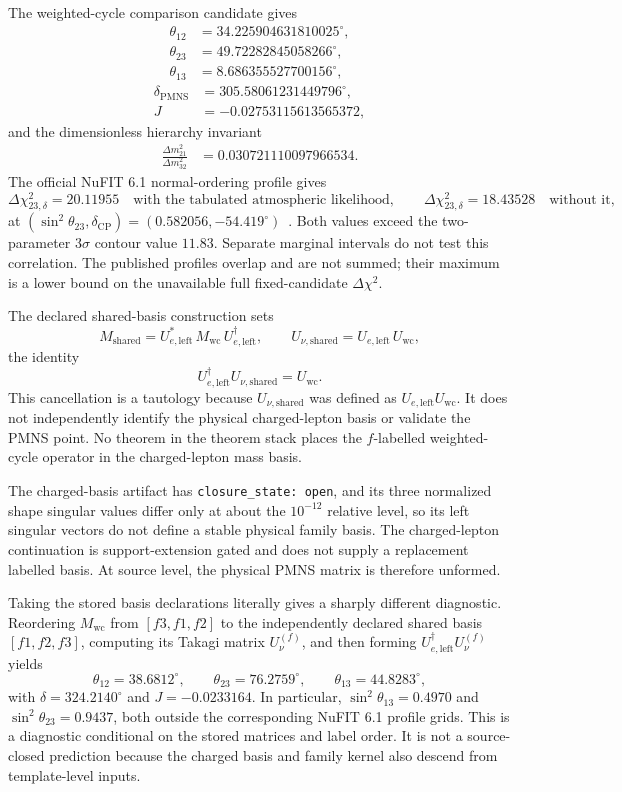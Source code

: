 \documentclass[11pt]{article}
\begin{document}
The weighted-cycle comparison candidate gives
\[
\begin{aligned}
\theta_{12}&=34.225904631810025^\circ,\\
\theta_{23}&=49.72282845058266^\circ,\\
\theta_{13}&=8.686355527700156^\circ,
\end{aligned}
\]
\[
\begin{aligned}
\delta_{\mathrm{PMNS}}&=305.58061231449796^\circ,\\
J&=-0.02753115613565372,
\end{aligned}
\]
and the dimensionless hierarchy invariant
\[
\begin{aligned}
\frac{\Delta m_{21}^2}{\Delta m_{32}^2}
&=0.030721110097966534.
\end{aligned}
\]
The official NuFIT 6.1 normal-ordering profile gives
\[
\Delta\chi^2_{23,\delta}=20.11955
\quad\text{with the tabulated atmospheric likelihood},
\qquad
\Delta\chi^2_{23,\delta}=18.43528
\quad\text{without it},
\]
at \((\sin^2\theta_{23},\delta_{\mathrm{CP}})=(0.582056,-54.419^\circ)\)~\cite{nufit61}.
Both values exceed the two-parameter \(3\sigma\) contour value \(11.83\). Separate marginal
intervals do not test this correlation. The published profiles overlap and are not summed;
their maximum is a lower bound on the unavailable full fixed-candidate \(\Delta\chi^2\).

The declared shared-basis construction sets
\[
M_{\mathrm{shared}}=U_{e,\mathrm{left}}^*\,M_{\mathrm{wc}}\,U_{e,\mathrm{left}}^\dagger,
\qquad
U_{\nu,\mathrm{shared}}=U_{e,\mathrm{left}}\,U_{\mathrm{wc}},
\]
the identity
\[
U_{e,\mathrm{left}}^\dagger U_{\nu,\mathrm{shared}}=U_{\mathrm{wc}}.
\]
This cancellation is a tautology because \(U_{\nu,\mathrm{shared}}\) was defined as
\(U_{e,\mathrm{left}}U_{\mathrm{wc}}\). It does not independently identify the physical
charged-lepton basis or validate the PMNS point. No theorem in the theorem stack places the
\(f\)-labelled weighted-cycle operator in the charged-lepton mass basis.

The charged-basis artifact has
\texttt{closure\_state: open}, and its three normalized shape singular values differ only at about
the \(10^{-12}\) relative level, so its left singular vectors do not define a stable physical
family basis. The charged-lepton continuation is support-extension gated and does not
supply a replacement labelled basis. At source level, the physical PMNS matrix is therefore
unformed.

Taking the stored basis declarations literally gives a sharply different diagnostic. Reordering
\(M_{\mathrm{wc}}\) from \([f3,f1,f2]\) to the independently declared shared basis
\([f1,f2,f3]\), computing its Takagi matrix \(U_\nu^{(f)}\), and then forming
\(U_{e,\mathrm{left}}^\dagger U_\nu^{(f)}\) yields
\[
\theta_{12}=38.6812^\circ,
\qquad
\theta_{23}=76.2759^\circ,
\qquad
\theta_{13}=44.8283^\circ,
\]
with \(\delta=324.2140^\circ\) and \(J=-0.0233164\). In particular,
\(\sin^2\theta_{13}=0.4970\) and \(\sin^2\theta_{23}=0.9437\), both outside the corresponding
NuFIT 6.1 profile grids. This is a diagnostic conditional on the stored matrices and label
order. It is not a source-closed prediction because the charged basis and family kernel also
descend from template-level inputs.
\end{document}
